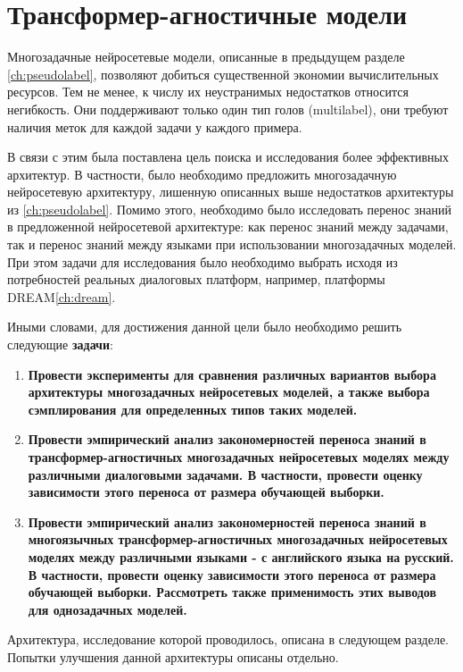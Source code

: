 \chapter{Трансформер-агностичные модели}\label{ch:tr-ag}
Многозадачные нейросетевые модели, описанные в предыдущем разделе \ref{ch:pseudolabel}, позволяют добиться существенной экономии вычислительных ресурсов. Тем не менее, к числу их неустранимых недостатков относится негибкость. Они поддерживают только один тип голов (multilabel), они требуют наличия меток для каждой задачи у каждого примера. 

В связи с этим была поставлена цель поиска и исследования более эффективных архитектур. В частности, было необходимо предложить многозадачную нейросетевую архитектуру, лишенную описанных выше недостатков архитектуры из \ref{ch:pseudolabel}. Помимо этого, необходимо было исследовать перенос знаний в предложенной нейросетевой архитектуре: как перенос знаний между задачами, так и перенос знаний между языками при использовании многозадачных моделей. При этом задачи для исследования было необходимо выбрать исходя из потребностей реальных диалоговых платформ, например, платформы DREAM\ref{ch:dream}. 

Иными словами, для достижения данной цели было необходимо решить следующие \textbf{задачи}:
\begin{enumerate}
  \item \textbf{Провести эксперименты для сравнения различных вариантов выбора архитектуры многозадачных нейросетевых моделей, а также выбора сэмплирования для определенных типов таких моделей.}
  \item \textbf{Провести эмпирический анализ закономерностей переноса знаний в трансформер-агностичных многозадачных нейросетевых моделях между различными диалоговыми задачами. В частности, провести оценку зависимости этого переноса от размера обучающей выборки.}
  \item \textbf{Провести эмпирический анализ закономерностей переноса знаний в многоязычных трансформер-агностичных многозадачных нейросетевых моделях между различными языками - с английского языка на русский. В частности, провести оценку зависимости этого переноса от размера обучающей выборки. Рассмотреть также применимость этих выводов для однозадачных моделей.}
\end{enumerate}


Архитектура, исследование которой проводилось, описана в следующем разделе. Попытки улучшения данной архитектуры описаны отдельно. 

